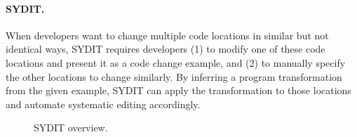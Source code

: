 \documentclass[runningheads,a4paper]{llncs}
\begin{document}
\paragraph{SYDIT.} When developers want to change multiple code locations in similar but not identical ways, SYDIT requires developers (1) to modify one of these code locations and present it as a code change example, and (2) to manually specify the other locations to change similarly. By inferring a program transformation from the given example, SYDIT can apply the transformation to those locations and automate systematic editing accordingly.

\begin{figure}
\centering
{}
\caption{SYDIT overview.}
\label{fig:syditoverview}
\end{figure}
\end{document}
